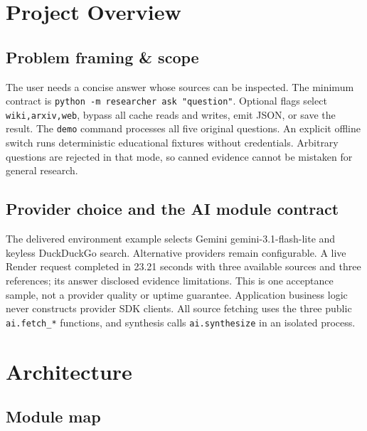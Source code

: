 \documentclass[11pt,a4paper]{article}
\begin{document}
\clearpage
\section{Project Overview}
\subsection{Problem framing \& scope}
The user needs a concise answer whose sources can be inspected. The minimum contract is \texttt{python -m researcher ask "question"}. Optional flags select \texttt{wiki,arxiv,web}, bypass all cache reads and writes, emit JSON, or save the result. The \texttt{demo} command processes all five original questions. An explicit offline switch runs deterministic educational fixtures without credentials. Arbitrary questions are rejected in that mode, so canned evidence cannot be mistaken for general research.

\subsection{Provider choice and the AI module contract}
The delivered environment example selects Gemini gemini-3.1-flash-lite and keyless DuckDuckGo search. Alternative providers remain configurable. A live Render request completed in 23.21 seconds with three available sources and three references; its answer disclosed evidence limitations. This is one acceptance sample, not a provider quality or uptime guarantee. Application business logic never constructs provider SDK clients. All source fetching uses the three public \texttt{ai.fetch\_*} functions, and synthesis calls \texttt{ai.synthesize} in an isolated process.

\section{Architecture}
\subsection{Module map}

\begin{center}
\end{center}
\end{document}

